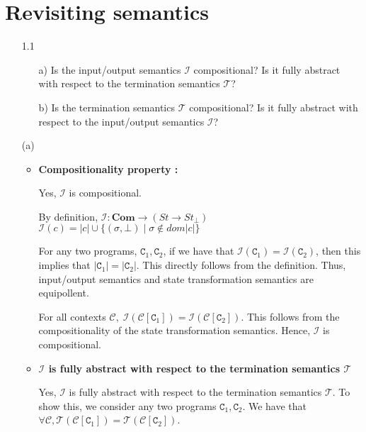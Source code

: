 \documentclass{article}
\newcommand{\C}{\mathtt{C}}
\newcommand{\question}[1]
{\color{DarkBlue}#1 \color{Black}}
\begin{document}

\section{Revisiting semantics}

\begin{enumerate}
\question{
\item[1.1] 
\begin{enumerate}
	\item[a)] Is the input/output semantics $\mathcal{I}$ compositional? Is it
	fully abstract with respect to the termination semantics $\mathcal{T}$?
	\item[b)] Is the termination semantics $\mathcal{T}$ compositional? Is it
	fully abstract with respect to the input/output semantics $\mathcal{I}$?
\end{enumerate}
}

(a) \begin{itemize}

\item \textbf{Compositionality property :}

	Yes, $\mathcal{I}$ is compositional. 
		
	By definition, 
	$\mathcal{I} : \textbf{Com} \rightarrow (St \rightarrow St_{ \bot })$
	$ \mathcal{I}(c) = | c | \cup  \{ (\sigma, \bot) \; | \; \sigma
	\notin dom | c | \} $
		
	For any two programs, $\C_1,\C_2$, if we have that $\mathcal{I}(\C_1) =
	\mathcal{I}(\C_2)$, 
	then this implies that $|\C_1| = | \C_2|$. This directly follows from the definition.
	Thus, input/output semantics and state transformation semantics are
	equipollent.
	
	For all contexts $\mathcal{C}, \; \mathcal{I}(\mathcal{C}[\C_1]) =	
	\mathcal{I}(\mathcal{C}[\C_2])$. This follows from the compositionality of the
	state transformation semantics. Hence, $\mathcal{I}$ is compositional. 

\item \textbf{$\mathcal{I}$ is fully abstract with respect to the termination
semantics $\mathcal{T}$}

	Yes, $\mathcal{I}$ is fully abstract with respect to the termination
	semantics $\mathcal{T}$.
	To show this, we consider any two programs $\C_1,\C_2$.
	We have that $\forall \mathcal{C},	
	\mathcal{T}(\mathcal{C}[\C_1]) = \mathcal{T}(\mathcal{C}[\C_2])$.	
 	

\end{itemize}
\end{enumerate}
\end{document}
